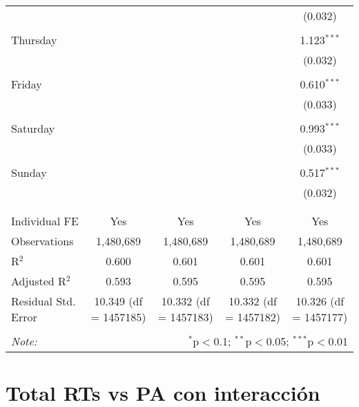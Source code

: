 \documentclass[
]{article}
\begin{document}
\begin{table}[!htbp]
{\begin{tabular}{@{\extracolsep{5pt}}lcccc}
  &  &  &  & (0.032) \\ 
  & & & & \\ 
 Thursday &  &  &  & 1.123$^{***}$ \\ 
  &  &  &  & (0.032) \\ 
  & & & & \\ 
 Friday &  &  &  & 0.610$^{***}$ \\ 
  &  &  &  & (0.033) \\ 
  & & & & \\ 
 Saturday &  &  &  & 0.993$^{***}$ \\ 
  &  &  &  & (0.033) \\ 
  & & & & \\ 
 Sunday &  &  &  & 0.517$^{***}$ \\ 
  &  &  &  & (0.032) \\ 
  & & & & \\ 
\hline \\[-1.8ex] 
Individual FE & Yes & Yes & Yes & Yes \\ 
Observations & 1,480,689 & 1,480,689 & 1,480,689 & 1,480,689 \\ 
R$^{2}$ & 0.600 & 0.601 & 0.601 & 0.601 \\ 
Adjusted R$^{2}$ & 0.593 & 0.595 & 0.595 & 0.595 \\ 
Residual Std. Error & 10.349 (df = 1457185) & 10.332 (df = 1457183) & 10.332 (df = 1457182) & 10.326 (df = 1457177) \\ 
\hline 
\hline \\[-1.8ex] 
\textit{Note:}  & \multicolumn{4}{r}{$^{*}$p$<$0.1; $^{**}$p$<$0.05; $^{***}$p$<$0.01} \\ 
\end{tabular}
} 
\end{table} 
\newpage
\section{Total RTs vs PA con interacción}
\end{document}
